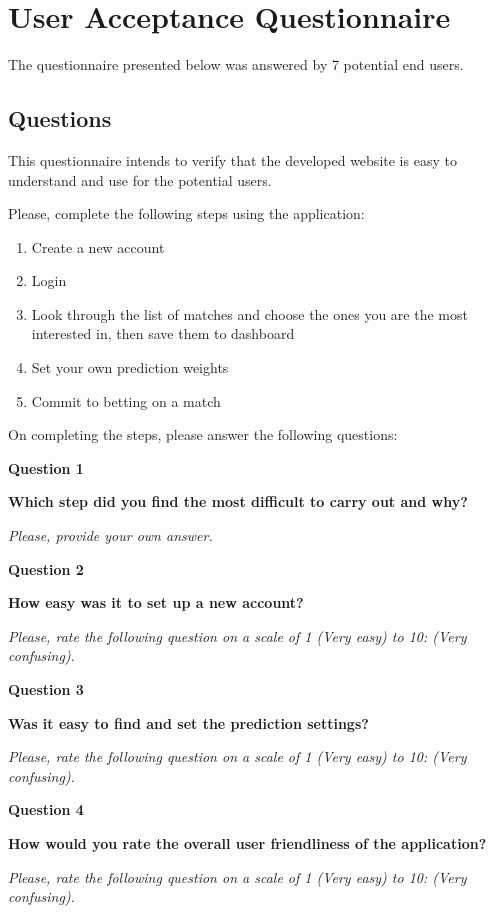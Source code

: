 \chapter{User Acceptance Questionnaire}
\label{ch:ua_questionnaire_appendix}
The questionnaire presented below was answered by 7 potential end users. 

\section{Questions}
\label{sec:ua_questions_appendix}
This questionnaire intends to verify that the developed website is easy to understand and use for the potential users.

Please, complete the following steps using the application: 

\begin{enumerate}
   \item Create a new account 
   \item Login 
   \item Look through the list of matches and choose the ones you are the most interested in, then save them to dashboard
   \item Set your own prediction weights 
   \item Commit to betting on a match
\end{enumerate}

On completing the steps, please answer the following questions:

\textbf{Question 1}\par
\textbf{Which step did you find the most difficult to carry out and why?}\par
\emph{Please, provide your own answer.}
 
\textbf{Question 2}\par
\textbf{How easy was it to set up a new account?}\par
\emph{Please, rate the following question on a scale of 1 (Very easy) to 10:  (Very confusing).}
 
\textbf{Question 3}\par
\textbf{Was it easy to find and set the prediction settings?}\par
 \emph{Please, rate the following question on a scale of 1 (Very easy) to 10:  (Very confusing).}
  
\textbf{Question 4}\par
\textbf{How would you rate the overall user friendliness of the application?}\par
 \emph{Please, rate the following question on a scale of 1 (Very easy) to 10:  (Very confusing). }
 
